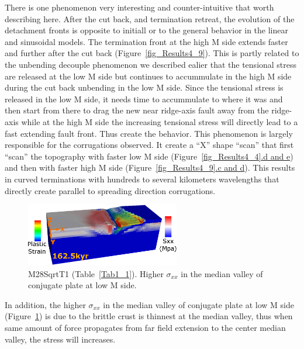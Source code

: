 There is one phenomenon very interesting and counter-intuitive that worth describing here. After the cut back, and termination retreat, the evolution of the detachment fronts is opposite to initiall or to the general behavior in the linear and sinusoidal models. The termination front at the high M side extends faster and further after the cut back (Figure~\hyperref[fig_Results4_9]{\ref{fig_Results4_9}}). This is partly related to the unbending decouple phenomenon we described ealier that the tensional stress are released at the low M side but continues to accummulate in the high M side during the cut back unbending in the low M side. Since the tensional stress is released in the low M side, it needs time to accummulate to where it was and then start from there to drag the new near ridge-axis fault away from the ridge-axis while at the high M side the increasing tensional stress will directly lead to a fast extending fault front. Thus create the behavior.  This phenomenon is largely responsible for the corrugations observed. It create a ``X'' shape ``scan'' that first ``scan'' the topography with faster low M side (Figure~\hyperref[fig_Results4_4]{\ref{fig_Results4_4}.d and e}) and then with faster high M side (Figure~\hyperref[fig_Results4_9]{\ref{fig_Results4_9}.c and d}). This results in curved terminations with hundreds to several kilometers wavelengths that directly create parallel to spreading direction corrugations.    

\begin{figure}[h]
  \centering
    \includegraphics[width=0.6\textwidth]{./Figures/fig_Results4_7_sqrt_cut_back_conjugate_Sxx.eps}
  \caption{M28SqrtT1 (Table~\hyperref[Tab1_1]{\ref{Tab1_1}}). Higher $\sigma_{xx}$ in the median valley of conjugate plate at low M side. }
 \label{fig_Results4_7}
\end{figure}

In addition, the higher $\sigma_{xx}$ in the median valley of conjugate plate at low M side (Figure~\hyperref[fig_Results4_7]{\ref{fig_Results4_7}}) is due to the brittle crust is thinnest at the median valley, thus when same amount of force propagates from far field extension to the center median valley, the stress will increases.    
\fi


